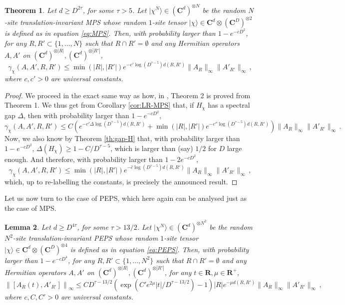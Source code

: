 \documentclass{amsart}
\newtheorem{theorem}{Theorem}[section]
\newtheorem{lemma}[theorem]{Lemma}
\newcommand{\R}{\mathbf{R}}
\newcommand{\C}{\mathbf{C}}
\renewcommand{\leq}{\leqslant}
\renewcommand{\geq}{\geqslant}
\newcommand{\ket}[1]{| #1 \rangle}
\begin{document}
\begin{theorem} \label{th:dc1'-MPS}
    Let $d\geq D^{2\tau}$, for some $\tau>5$. Let $\ket{\chi^{N}}\in(\C^d)^{\otimes N}$ be the random $N$-site translation-invariant MPS whose random $1$-site tensor $\ket{\chi}\in\C^d\otimes(\C^D)^{\otimes 2}$ is defined as in equation \eqref{eq:MPS}. Then, with probability larger than $1-e^{-cD^2}$, for any $R,R'\subset\{1,\ldots,N\}$ such that $R\cap R'=\emptyset$ and any Hermitian operators $A,A'$ on $(\C^d)^{\otimes |R|},(\C^d)^{\otimes |R'|}$,
    \[ \gamma_{\chi}(A,A',R,R') \leq \min(|R|,|R'|)e^{-c'\log(D^{\tau-5}) d(R,R')} \|A_R\|_{\infty}\|A'_{R'}\|_{\infty} \, , \]
    where $c,c'>0$ are universal constants.
\end{theorem}

\begin{proof}
    We proceed in the exact same way as how, in \cite{Has3}, Theorem 2 is proved from Theorem 1. We thus get from Corollary \ref{cor:LR-MPS} that, if $H_{\chi}$ has a spectral gap $\Delta$, then with probability larger than $1-e^{-cD^2}$,
    \[ \gamma_{\chi}(A,A',R,R') \leq C\left( e^{-c'\Delta\log(D^{\tau-5})d(R,R')} + \min(|R|,|R'|)e^{-c''\log(D^{\tau-5}) d(R,R')} \right) \|A_R\|_{\infty}\|A'_{R'}\|_{\infty} \, . \]
    Now, we also know by Theorem \ref{th:gap-H} that, with probability larger than $1-e^{-cD^2}$, $\Delta(H_{\chi})\geq 1-C/D^{\tau-5}$, which is larger than (say) $1/2$ for $D$ large enough. And therefore, with probability larger than $1-2e^{-cD^2}$,
    \[ \gamma_{\chi}(A,A',R,R') \leq \min(|R|,|R'|)e^{-\hat{c}\log(D^{\tau-5}) d(R,R')} \|A_R\|_{\infty}\|A'_{R'}\|_{\infty} \, , \]
    which, up to re-labelling the constants, is precisely the announced result.
\end{proof}

Let us now turn to the case of PEPS, which here again can be analysed just as the case of MPS.

\begin{lemma} \label{lem:LR-PEPS}
    Let $d\geq D^{4\tau}$, for some $\tau>13/2$. Let $\ket{\chi^N}\in(\C^d)^{\otimes N^2}$ be the random $N^2$-site translation-invariant PEPS whose random $1$-site tensor $\ket{\chi}\in\C^d\otimes(\C^D)^{\otimes 4}$ is defined as in equation \eqref{eq:PEPS}. Then, with probability larger than $1-e^{-cD^4}$, for any $R,R'\subset\{1,\ldots,N^2\}$ such that $R\cap R'=\emptyset$ and any Hermitian operators $A,A'$ on $(\C^d)^{\otimes |R|},(\C^d)^{\otimes |R'|}$, for any $t\in\R,\mu\in\R^+$,
    \[ \left\| \left[ A_R(t),A'_{R'} \right] \right\|_{\infty} \leq CD^{\tau-13/2} \left( \exp\left(C'e^{2\mu}|t|/D^{\tau-13/2}\right) -1 \right) |R|e^{-\mu d(R,R')} \|A_R\|_{\infty}\|A'_{R'}\|_{\infty} \, , \]
    where $c,C,C'>0$ are universal constants.
\end{lemma}
\end{document}
